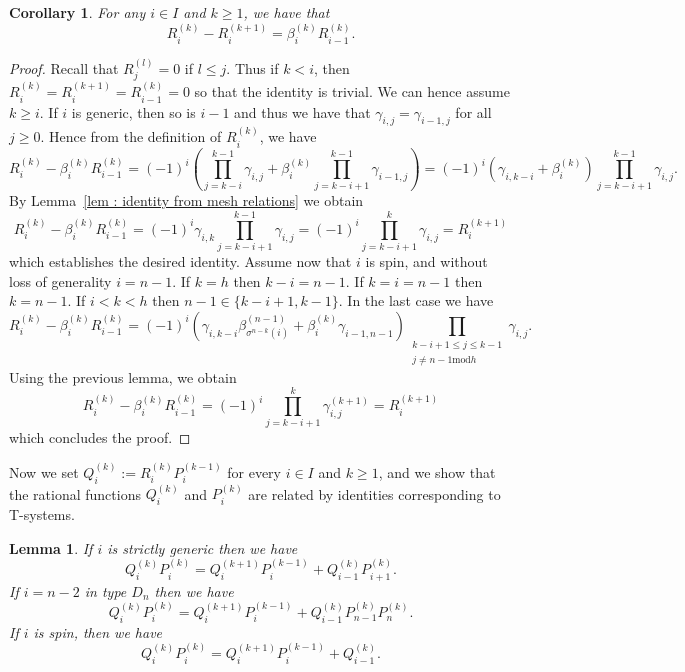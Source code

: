\documentclass[12pt]{amsart}
\theoremstyle{plain}
\newtheorem{lemma}[theorem]{Lemma}
\newtheorem{corollary}[theorem]{Corollary}
\theoremstyle{definition}
\numberwithin{equation}{section}
\begin{document}
 \begin{corollary} \label{coro : recursion on Rs}
 For any $i \in I$ and $k \geq 1$, we have that
$$ R_i^{(k)} - R_i^{(k+1)} = \beta_i^{(k)} R_{i-1}^{(k)} . $$
 \end{corollary} 
   
\begin{proof}
Recall that $R_j^{(l)} = 0$ if $l \leq j$. Thus if $k<i$, then $R_i^{(k)} = R_i^{(k+1)} = R_{i-1}^{(k)} = 0$ so that the identity is trivial. We can hence assume $k \geq i$. If $i$ is generic, then so is $i-1$ and thus we have that $\gamma_{i,j} = \gamma_{i-1,j}$ for all $j \geq 0$. Hence from the definition of $R_i^{(k)}$, we have 
 $$ R_i^{(k)} - \beta_i^{(k)} R_{i-1}^{(k)} = (-1)^{i} \left(  \prod_{j=k-i}^{k-1} \gamma_{i,j} + \beta_i^{(k)} \prod_{j=k-i+1}^{k-1} \gamma_{i-1,j}  \right) = (-1)^{i}(\gamma_{i,k-i} + \beta_i^{(k)}) \prod_{j=k-i+1}^{k-1} \gamma_{i,j} . $$
 By Lemma~\ref{lem : identity from mesh relations} we obtain 
 $$R_i^{(k)} - \beta_i^{(k)} R_{i-1}^{(k)} = (-1)^{i} \gamma_{i,k} \prod_{j=k-i+1}^{k-1} \gamma_{i,j} = (-1)^{i} \prod_{j=k-i+1}^k \gamma_{i,j} = R_i^{(k+1)}  $$
 which establishes the desired identity. 
 Assume now that $i$ is spin, and without loss of generality $i=n-1$. If $k=h$ then $k-i=n-1$. If $k=i=n-1$ then $k=n-1$.  If $i<k<h$ then $n-1 \in \{ k-i+1 , k-1 \}$. 
 In the last case we have 
 $$ R_{i}^{(k)} - \beta_{i}^{(k)} R_{i-1}^{(k)} = (-1)^{i} \left( \gamma_{i,k-i} \beta_{\sigma^{n-k}(i)}^{(n-1)} + \beta_i^{(k)} \gamma_{i-1,n-1}  \right) \prod_{ \substack{ k-i+1 \leq j \leq k-1 \\ j \neq n-1 \mathrm{mod} h}} \gamma_{i,j} .  $$
Using the previous lemma, we obtain 
$$R_{i}^{(k)} - \beta_{i}^{(k)} R_{i-1}^{(k)} = (-1)^{i} \prod_{j=k-i+1}^{k} \gamma_{i,j}^{(k+1)} = R_i^{(k+1)} $$
which concludes the proof. 
 
\end{proof}

 Now we set $Q_i^{(k)} := R_i^{(k)} P_i^{(k-1)}$ for every $i \in I$ and $k \geq 1$, and we show that the rational functions $Q_i^{(k)}$ and $P_i^{(k)}$ are related by identities corresponding to T-systems. 

 \begin{lemma} \label{lem : T-systems between Q and P}
 If $i$ is strictly generic then we have 
  $$ Q_i^{(k)} P_i^{(k)} = Q_i^{(k+1)} P_i^{(k-1)} + Q_{i-1}^{(k)} P_{i+1}^{(k)} . $$   
  If $i= n-2$ in type $D_n$ then we have 
  $$Q_i^{(k)} P_i^{(k)} = Q_i^{(k+1)} P_i^{(k-1)} + Q_{i-1}^{(k)} P_{n-1}^{(k)} P_n^{(k)} . $$
  If $i$ is spin, then we have 
  $$ Q_i^{(k)} P_i^{(k)} = Q_i^{(k+1)} P_i^{(k-1)} + Q_{i-1}^{(k)}. $$
 \end{lemma}
\end{document}

